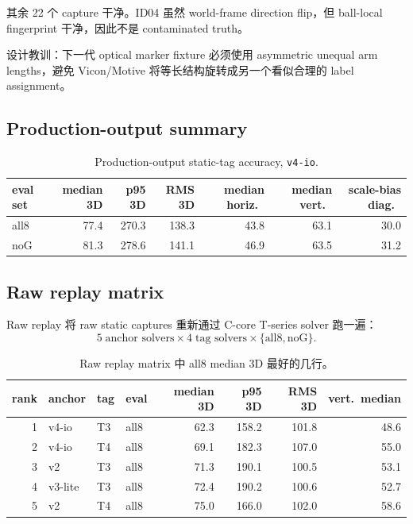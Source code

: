 \documentclass[11pt,a4paper]{article}
\begin{document}
\noindent
其余 22 个 capture 干净。ID04 虽然 world-frame direction flip，但 ball-local fingerprint
干净，因此不是 contaminated truth。

设计教训：下一代 optical marker fixture 必须使用 asymmetric unequal arm lengths，避免
Vicon/Motive 将等长结构旋转成另一个看似合理的 label assignment。

\subsection{Production-output summary}
\begin{table}[h]
\centering
\caption{Production-output static-tag accuracy, \texttt{v4-io}.}
\begin{tabular}{lrrrrrr}
\toprule
eval set & median 3D & p95 3D & RMS 3D & median horiz.\ & median vert.\ & scale-bias diag.\ \\
\midrule
all8 & 77.4 & 270.3 & 138.3 & 43.8 & 63.1 & 30.0 \\
noG  & 81.3 & 278.6 & 141.1 & 46.9 & 63.5 & 31.2 \\
\bottomrule
\end{tabular}
\end{table}

\subsection{Raw replay matrix}
Raw replay 将 raw static captures 重新通过 C-core T-series solver 跑一遍：
\[
5\;\text{anchor solvers}\times4\;\text{tag solvers}\times\{\text{all8},\text{noG}\}.
\]

\begin{table}[h]
\centering
\caption{Raw replay matrix 中 all8 median 3D 最好的几行。}
\begin{tabular}{rlllrrrr}
\toprule
rank & anchor & tag & eval & median 3D & p95 3D & RMS 3D & vert.\ median \\
\midrule
1 & v4-io   & T3 & all8 & 62.3 & 158.2 & 101.8 & 48.6 \\
2 & v4-io   & T4 & all8 & 69.1 & 182.3 & 107.0 & 55.0 \\
3 & v2      & T3 & all8 & 71.3 & 190.1 & 100.5 & 53.1 \\
4 & v3-lite & T3 & all8 & 72.4 & 190.2 & 100.6 & 52.7 \\
5 & v2      & T4 & all8 & 75.0 & 166.0 & 102.0 & 58.6 \\
\bottomrule
\end{tabular}
\end{table}
\end{document}

